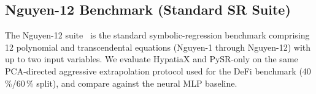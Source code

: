 
\subsection{Nguyen-12 Benchmark (Standard SR Suite)}\label{subsec:nguyen12-benchmark-standard-sr-suite}
\label{sec:nguyen12}

The Nguyen-12 suite~\citep{uy2011semantically} is the standard symbolic-regression
benchmark comprising 12 polynomial and transcendental equations (Nguyen-1 through
Nguyen-12) with up to two input variables.  We evaluate HypatiaX and PySR-only on
the same PCA-directed aggressive extrapolation protocol used for the DeFi benchmark
(40\,\%/60\,\% split), and compare against the neural MLP baseline.

